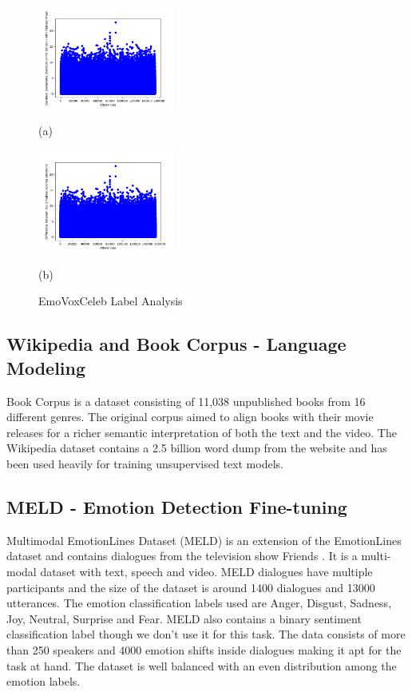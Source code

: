 \documentclass{article}
\begin{document}
\begin{figure}[htb]

\begin{minipage}[b]{.48\linewidth}
  \centering
  \centerline{\includegraphics[width=4.5cm]{emovox_1}}
  (a)
\end{minipage}
\hfill
\begin{minipage}[b]{0.48\linewidth}
  \centering
  \centerline{\includegraphics[width=4.5cm]{emovox_2}}
  (b)
\end{minipage}
  \caption{EmoVoxCeleb Label Analysis}
\end{figure}

\subsection{Wikipedia and Book Corpus - Language Modeling}

Book Corpus \cite{bookcorpus} is a dataset consisting of 11,038 unpublished books from 16 different genres. The original corpus aimed to align books with their movie releases for a richer semantic interpretation of both the text and the video. The Wikipedia dataset contains a 2.5 billion word dump from the website and has been used heavily for training unsupervised text models.

\subsection{MELD - Emotion Detection Fine-tuning}

Multimodal EmotionLines Dataset (MELD) is an extension of the EmotionLines dataset \cite{emotionlines} and contains dialogues from the television show Friends \cite{meld}. It is a multi-modal dataset with text, speech and video. MELD dialogues have multiple participants and the size of the dataset is around 1400 dialogues and 13000 utterances. The emotion classification labels used are Anger, Disgust, Sadness, Joy, Neutral, Surprise and Fear. MELD also contains a binary sentiment classification label though we don't use it for this task. The data consists of more than 250 speakers and 4000 emotion shifts inside dialogues making it apt for the task at hand. The dataset is well balanced with an even distribution among the emotion labels.
\end{document}

